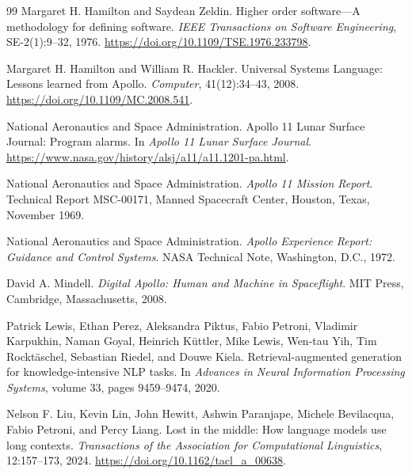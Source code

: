 \documentclass[11pt]{report}
\begin{document}
\begin{thebibliography}{99}
Margaret H. Hamilton and Saydean Zeldin.
\newblock Higher order software---A methodology for defining software.
\newblock \emph{IEEE Transactions on Software Engineering},
SE-2(1):9--32, 1976.
\newblock \url{https://doi.org/10.1109/TSE.1976.233798}.

Margaret H. Hamilton and William R. Hackler.
\newblock Universal Systems Language: Lessons learned from Apollo.
\newblock \emph{Computer}, 41(12):34--43, 2008.
\newblock \url{https://doi.org/10.1109/MC.2008.541}.

National Aeronautics and Space Administration.
\newblock Apollo 11 Lunar Surface Journal: Program alarms.
\newblock In \emph{Apollo 11 Lunar Surface Journal}.
\newblock \url{https://www.nasa.gov/history/alsj/a11/a11.1201-pa.html}.

National Aeronautics and Space Administration.
\newblock \emph{Apollo 11 Mission Report}.
\newblock Technical Report MSC-00171, Manned Spacecraft Center,
Houston, Texas, November 1969.

National Aeronautics and Space Administration.
\newblock \emph{Apollo Experience Report: Guidance and Control Systems}.
\newblock NASA Technical Note, Washington, D.C., 1972.

David A. Mindell.
\newblock \emph{Digital Apollo: Human and Machine in Spaceflight}.
\newblock MIT Press, Cambridge, Massachusetts, 2008.


Patrick Lewis, Ethan Perez, Aleksandra Piktus, Fabio Petroni,
Vladimir Karpukhin, Naman Goyal, Heinrich K\"uttler, Mike Lewis,
Wen-tau Yih, Tim Rockt\"aschel, Sebastian Riedel, and Douwe Kiela.
\newblock Retrieval-augmented generation for knowledge-intensive NLP tasks.
\newblock In \emph{Advances in Neural Information Processing Systems},
volume 33, pages 9459--9474, 2020.

Nelson F. Liu, Kevin Lin, John Hewitt, Ashwin Paranjape,
Michele Bevilacqua, Fabio Petroni, and Percy Liang.
\newblock Lost in the middle: How language models use long contexts.
\newblock \emph{Transactions of the Association for Computational
Linguistics}, 12:157--173, 2024.
\newblock \url{https://doi.org/10.1162/tacl_a_00638}.


\end{thebibliography}
\end{document}
